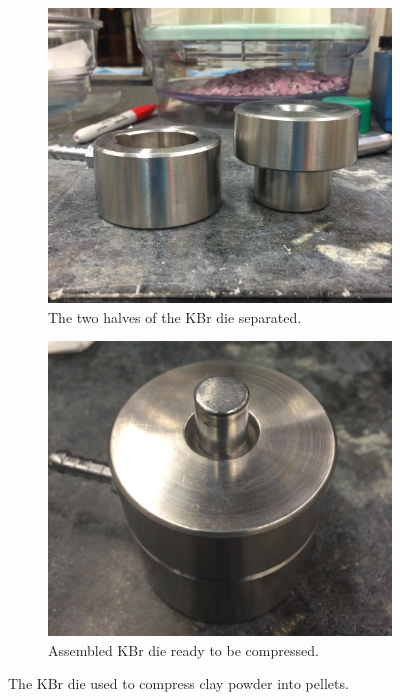 \begin{figure}
	\centering
	\begin{subfigure}{.5\textwidth}
		\centering
		\includegraphics[scale=0.12]{images/die_opened.jpg}
		\caption{The two halves of the KBr die separated.}
		\label{fig:die_opened}
	\end{subfigure}%
	\begin{subfigure}{.5\textwidth}
		\centering
		\includegraphics[scale=0.12]{images/die_closed.jpg}
		\caption{Assembled KBr die ready to be compressed.}
		\label{fig:die_closed}
	\end{subfigure}
	\caption{The KBr die used to compress clay powder into pellets.}
	\label{fig:KBr_die}
\end{figure}


